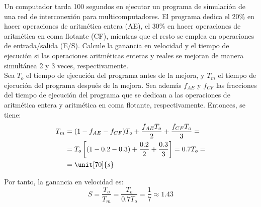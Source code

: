 \begin{ejercicio}
Un computador tarda 100 segundos en ejecutar un programa de simulación de una red de interconexión para multicomputadores. El programa dedica el 20\% en hacer operaciones de aritmética entera (AE), el 30\% en hacer operaciones de aritmética en coma flotante (CF), mientras que el resto se emplea en operaciones de entrada/salida (E/S). Calcule la ganancia en velocidad y el tiempo de ejecución si las operaciones aritméticas enteras y reales se mejoran de manera simultánea 2 y 3 veces, respectivamente.\\

Sea $T_o$ el tiempo de ejecución del programa antes de la mejora, y $T_m$ el tiempo de ejecución del programa después de la mejora. Sea además $f_{AE}$ y $f_{CF}$ las fracciones del tiempo de ejecución del programa que se dedican a las operaciones de aritmética entera y aritmética en coma flotante, respectivamente. Entonces, se tiene:
\begin{align*}
    T_m &= (1-f_{AE}-f_{CF})T_o + \dfrac{f_{AE}T_o}{2} + \dfrac{f_{CF}T_o}{3}
    =\\&= T_o\left[(1-0.2-0.3) + \dfrac{0.2}{2} + \dfrac{0.3}{3}\right]
    = 0.7T_o
    =\\&= \unit[70]{s}
\end{align*}

Por tanto, la ganancia en velocidad es:
\begin{equation*}
    S = \dfrac{T_o}{T_m} = \dfrac{T_o}{0.7T_o} = \frac{1}{7} \approx 1.43
\end{equation*}
\end{ejercicio}

